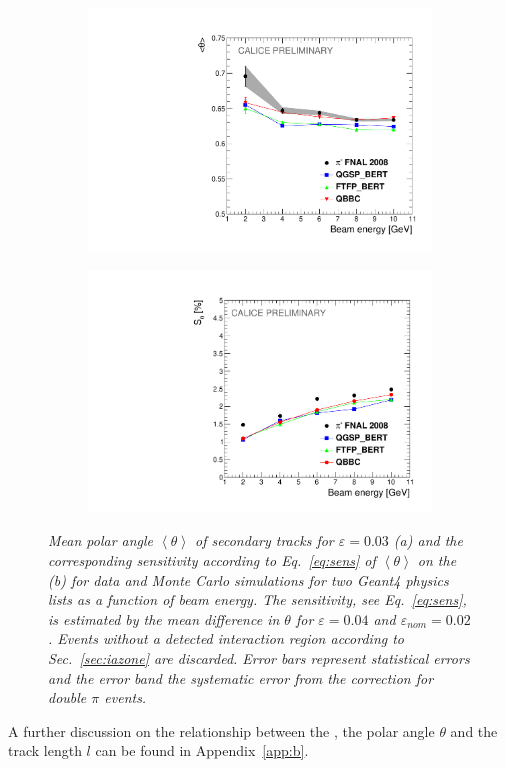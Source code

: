 \begin{figure}
	\centering
	\begin{subfigure}{0.5\textwidth}
		\centering
		\includegraphics[width=.90\linewidth]{ECAL/plots/theta-graph.pdf}
		\caption{\label{fig:thetagraph}}
	\end{subfigure}%
	\begin{subfigure}{0.5\textwidth}
		\centering
		\includegraphics[width=.90\linewidth]{ECAL/plots/theta-graph-delta.pdf}
		\caption{\label{fig:dthetagraph} }
	\end{subfigure}
	\caption{\label{fig:fullthetagraph} \sl Mean polar angle $\left<\theta\right>$ of secondary tracks for $\varepsilon = 0.03$  (a) and the corresponding sensitivity according to Eq.~\ref{eq:sens} of $\left<\theta\right>$ on the \ep\,(b) for data and Monte Carlo simulations for two {\sc Geant}4 physics lists as a function of beam energy. The sensitivity, see Eq.~\ref{eq:sens}, is estimated by the mean difference in $\theta$ for $\varepsilon = 0.04$ and $\varepsilon_{nom} = 0.02$. Events without a detected interaction region according to Sec.~\ref{sec:iazone} are discarded. Error bars represent statistical errors and the error band the systematic error from the correction for double $\pi$ events.}
\end{figure}
A further discussion on the relationship between the \ep ,  the polar angle $\theta$ and the track length $l$ can be found in Appendix~\ref{app:b}.

